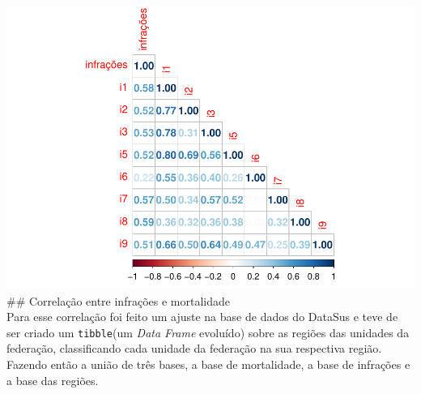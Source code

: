 \documentclass[
]{book}
\begin{document}
\includegraphics{_main_files/figure-latex/unnamed-chunk-26-1.pdf}
\#\# Correlação entre infrações e mortalidade\\
Para esse correlação foi feito um ajuste na base de dados do DataSus e teve de ser criado um \texttt{tibble}(um \emph{Data Frame} evoluído) sobre as regiões das unidades da federação, classificando cada unidade da federação na sua respectiva região. Fazendo então a união de três bases, a base de mortalidade, a base de infrações e a base das regiões.
\end{document}
